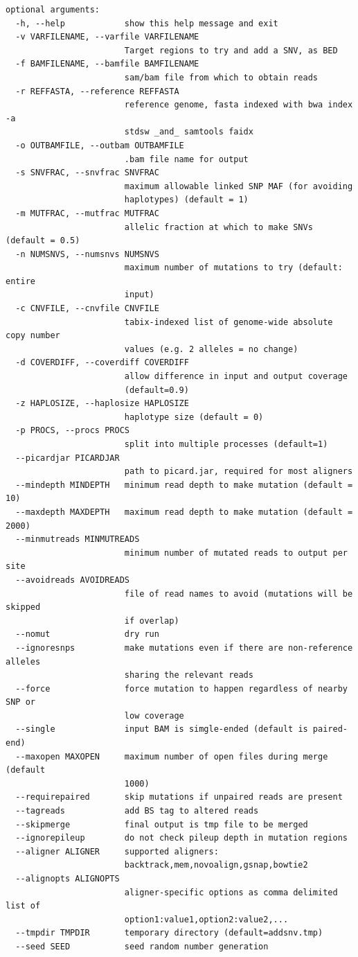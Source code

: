 \documentclass[letterpaper,11pt]{article}
\begin{document}
\begin{verbatim}
optional arguments:
  -h, --help            show this help message and exit
  -v VARFILENAME, --varfile VARFILENAME
                        Target regions to try and add a SNV, as BED
  -f BAMFILENAME, --bamfile BAMFILENAME
                        sam/bam file from which to obtain reads
  -r REFFASTA, --reference REFFASTA
                        reference genome, fasta indexed with bwa index -a
                        stdsw _and_ samtools faidx
  -o OUTBAMFILE, --outbam OUTBAMFILE
                        .bam file name for output
  -s SNVFRAC, --snvfrac SNVFRAC
                        maximum allowable linked SNP MAF (for avoiding
                        haplotypes) (default = 1)
  -m MUTFRAC, --mutfrac MUTFRAC
                        allelic fraction at which to make SNVs (default = 0.5)
  -n NUMSNVS, --numsnvs NUMSNVS
                        maximum number of mutations to try (default: entire
                        input)
  -c CNVFILE, --cnvfile CNVFILE
                        tabix-indexed list of genome-wide absolute copy number
                        values (e.g. 2 alleles = no change)
  -d COVERDIFF, --coverdiff COVERDIFF
                        allow difference in input and output coverage
                        (default=0.9)
  -z HAPLOSIZE, --haplosize HAPLOSIZE
                        haplotype size (default = 0)
  -p PROCS, --procs PROCS
                        split into multiple processes (default=1)
  --picardjar PICARDJAR
                        path to picard.jar, required for most aligners
  --mindepth MINDEPTH   minimum read depth to make mutation (default = 10)
  --maxdepth MAXDEPTH   maximum read depth to make mutation (default = 2000)
  --minmutreads MINMUTREADS
                        minimum number of mutated reads to output per site
  --avoidreads AVOIDREADS
                        file of read names to avoid (mutations will be skipped
                        if overlap)
  --nomut               dry run
  --ignoresnps          make mutations even if there are non-reference alleles
                        sharing the relevant reads
  --force               force mutation to happen regardless of nearby SNP or
                        low coverage
  --single              input BAM is simgle-ended (default is paired-end)
  --maxopen MAXOPEN     maximum number of open files during merge (default
                        1000)
  --requirepaired       skip mutations if unpaired reads are present
  --tagreads            add BS tag to altered reads
  --skipmerge           final output is tmp file to be merged
  --ignorepileup        do not check pileup depth in mutation regions
  --aligner ALIGNER     supported aligners:
                        backtrack,mem,novoalign,gsnap,bowtie2
  --alignopts ALIGNOPTS
                        aligner-specific options as comma delimited list of
                        option1:value1,option2:value2,...
  --tmpdir TMPDIR       temporary directory (default=addsnv.tmp)
  --seed SEED           seed random number generation

\end{verbatim}
\end{document}
